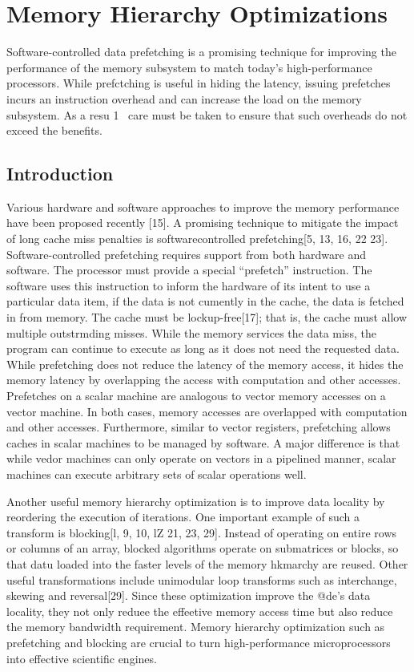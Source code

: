 \newpage 

\section{Memory Hierarchy Optimizations}

Software-controlled data prefetching is a promising technique for
improving the performance of the memory subsystem to match
today’s high-performance processors. While prefctching is useful in
hiding the latency, issuing prefetches incurs an instruction overhead
and can increase the load on the memory subsystem. As a resu 1~
care must be taken to ensure that such overheads do not exceed the
benefits.


\subsection{Introduction}

Various hardware and software approaches to improve the memory
performance have been proposed recently [15]. A promising technique 
to mitigate the impact of long cache miss penalties is softwarecontrolled
 prefetching[5, 13, 16, 22 23]. Software-controlled
prefetching requires support from both hardware and software. The
processor must provide a special “prefetch” instruction. The software 
uses this instruction to inform the hardware of its intent
to use a particular data item, if the data is not cumently in the
cache, the data is fetched in from memory. The cache must be
lockup-free[17]; that is, the cache must allow multiple outstrmding
 misses. While the memory services the data miss, the program
can continue to execute as long as it does not need the requested
data. While prefetching does not reduce the latency of the memory
access, it hides the memory latency by overlapping the access with
computation and other accesses. Prefetches on a scalar machine
are analogous to vector memory accesses on a vector machine. In
both cases, memory accesses are overlapped with computation and
other accesses. Furthermore, similar to vector registers, prefetching
allows caches in scalar machines to be managed by software. A
major difference is that while vedor machines can only operate on
vectors in a pipelined manner, scalar machines can execute arbitrary
sets of scalar operations well.


Another useful memory hierarchy optimization is to improve data
locality by reordering the execution of iterations. One important
example of such a transform is blocking[l, 9, 10, lZ 21, 23, 29].
Instead of operating on entire rows or columns of an array, blocked
algorithms operate on submatrices or blocks, so that datu loaded
into the faster levels of the memory hkmarchy are reused. Other
useful transformations include unimodular loop transforms such as
interchange, skewing and reversal[29]. Since these optimization
improve the @de’s data locality, they not only reduee the effeetive
 memory access time but also reduce the memory bandwidth
requirement. Memory hierarchy optimization such as prefetching
and blocking are crucial to turn high-performance microprocessors
into effective scientific engines.



